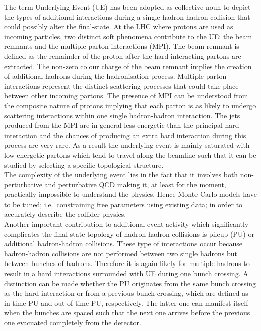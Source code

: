 The term Underlying Event (UE) has been adopted as collective noun to depict the types of additional interactions during a single hadron-hadron collision that could possibly alter the final-state. At the LHC where protons are used as incoming particles, two distinct soft phenomena contribute to the UE: the beam remnants and the multiple parton interactions (MPI).
The beam remnant is defined as the remainder of the proton after the hard-interacting partons are extracted. The non-zero colour charge of the beam remnant implies the creation of additional hadrons during the hadronisation process.
Multiple parton interactions represent the distinct scattering processes that could take place between other incoming partons. 
The presence of MPI can be understood from the composite nature of protons implying that each parton is as likely to undergo scattering interactions within one single hadron-hadron interaction.
The jets produced from the MPI  are in general less energetic than the principal hard interaction and the chances of producing an extra hard interaction during this process are very rare.
As a result the underlying event is mainly saturated with low-energetic partons which tend to travel along the beamline such that it can be studied by selecting a specific topological structure.
\\
The complexity of the underlying event lies in the fact that it involves both non-perturbative and perturbative QCD making it, at least for the moment, practically impossible to understand the physics. Hence Monte Carlo models have to be tuned; i.e.\ constraining free parameters using existing data; in order to accurately describe the collider physics.
\\

Another important contribution to additional event activity which significantly complicates the final-state topology of hadron-hadron collisions is pileup (PU) or additional hadron-hadron collisions. These type of interactions occur because hadron-hadron collisions are not performed between two single hadrons but between bunches of hadrons. Therefore it is again likely for multiple hadrons to result in a hard interactions surrounded with UE during one bunch crossing. A distinction can be made whether the PU originates from the same bunch crossing as the hard interaction or from a previous bunch crossing, which are defined as in-time PU and out-of-time PU, respectively. The latter one can manifest itself when the bunches are spaced such that the next one arrives before the previous one evacuated completely from the detector.

